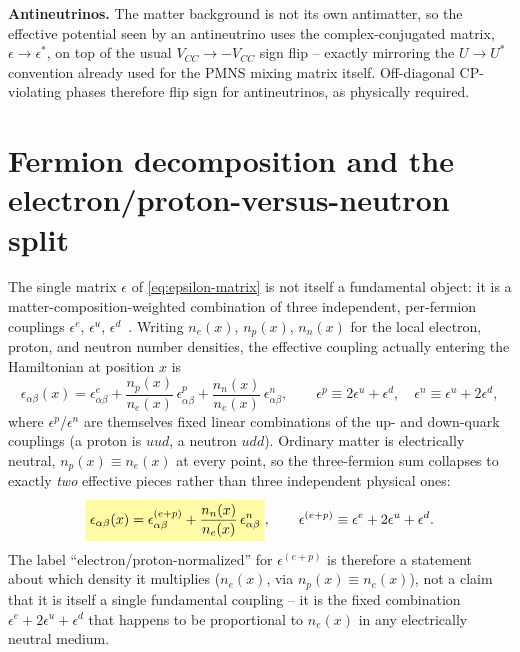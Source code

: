 \begin{notebox}
\textbf{Antineutrinos.} The matter background is not its own antimatter, so
the effective potential seen by an antineutrino uses the complex-conjugated
matrix, $\epsilon\to\epsilon^{*}$, on top of the usual $V_{CC}\to-V_{CC}$ sign
flip -- exactly mirroring the $U\to U^{*}$ convention already used for the
PMNS mixing matrix itself. Off-diagonal CP-violating phases therefore flip
sign for antineutrinos, as physically required.
\end{notebox}

\section{Fermion decomposition and the electron/proton-versus-neutron split}
\label{sec:theory-composition}

\begin{theorybox}
The single matrix $\epsilon$ of \cref{eq:epsilon-matrix} is not itself a
fundamental object: it is a matter-composition-weighted combination of three
independent, per-fermion couplings $\epsilon^{e}$, $\epsilon^{u}$,
$\epsilon^{d}$~\parencite{OhlssonNSIReview2013,FarzanTortolaNSIReview2018,KikuchiMinakataUchinami2009}.
Writing $n_e(x)$, $n_p(x)$, $n_n(x)$ for the local electron, proton, and
neutron number densities, the effective coupling actually entering the
Hamiltonian at position $x$ is
\begin{equation}
  \epsilon_{\alpha\beta}(x) = \epsilon_{\alpha\beta}^{e}
  + \frac{n_p(x)}{n_e(x)}\,\epsilon_{\alpha\beta}^{p}
  + \frac{n_n(x)}{n_e(x)}\,\epsilon_{\alpha\beta}^{n},
  \qquad
  \epsilon^{p}\equiv2\epsilon^{u}+\epsilon^{d},
  \quad
  \epsilon^{n}\equiv\epsilon^{u}+2\epsilon^{d},
\end{equation}
where $\epsilon^p$/$\epsilon^n$ are themselves fixed linear combinations of
the up- and down-quark couplings (a proton is $uud$, a neutron $udd$).
Ordinary matter is electrically neutral, $n_p(x)\equiv n_e(x)$ at every
point, so the three-fermion sum collapses to exactly \emph{two} effective
pieces rather than three independent physical ones:
\begin{equation}
  \keyresult{\epsilon_{\alpha\beta}(x) = \epsilon_{\alpha\beta}^{(e+p)}
  + \frac{n_n(x)}{n_e(x)}\,\epsilon_{\alpha\beta}^{n}},
  \qquad
  \epsilon^{(e+p)} \equiv \epsilon^{e} + 2\epsilon^{u} + \epsilon^{d}.
  \label{eq:epsilon-composition}
\end{equation}
The label ``electron/proton-normalized'' for $\epsilon^{(e+p)}$ is therefore a
statement about which density it multiplies ($n_e(x)$, via $n_p(x)\equiv
n_e(x)$), not a claim that it is itself a single fundamental coupling -- it
is the fixed combination $\epsilon^{e}+2\epsilon^{u}+\epsilon^{d}$ that
happens to be proportional to $n_e(x)$ in any electrically neutral medium.
\end{theorybox}

